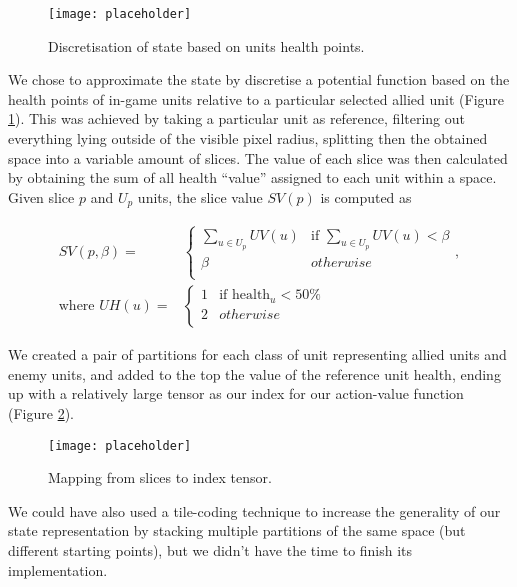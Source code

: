 \begin{figure}[h]
    \centering
    \texttt{[image: placeholder]}
    \caption{Discretisation of state based on units health points.}
    \label{fig:discrete_state}
\end{figure}

We chose to approximate the state by discretise a potential function
\citep{diebelthrun} based on the health points of in-game units relative to a
particular selected allied unit (Figure \ref{fig:discrete_state}). This was
achieved by taking a particular unit as reference, filtering out everything
lying outside of the visible pixel radius, splitting then the obtained space
into a variable amount of slices. The value of each slice was then calculated by
obtaining the sum of all health ``value'' assigned to each unit within a space.
Given slice $p$ and $U_p$ units, the slice value $SV(p)$ is computed as

\begin{equation}
  \begin{aligned}
    SV(p, \beta) = & 
    \begin{cases}
      \sum_{u \in U_p}{UV(u)} & \text{if } \sum_{u \in U_p}{UV(u)} < \beta \\
      \beta & otherwise\\
    \end{cases}, \\ \text{where } 
    UH(u) = &
    \begin{cases}
      1 & \text{if } \text{health}_u < 50\%\\
      2 & otherwise \\
    \end{cases} 
  \end{aligned}
\end{equation}

We created a pair of partitions for each class of unit representing allied units
and enemy units, and added to the top the value of the reference unit health,
ending up with a relatively large tensor as our index for our action-value
function (Figure \ref{fig:array_state}).

\begin{figure}[h]
    \centering
    \texttt{[image: placeholder]}
    \caption{Mapping from slices to index tensor.}
    \label{fig:array_state}
\end{figure}

We could have also used a tile-coding
technique\citep{stone_sutton_keepaway} to increase the generality of our state
representation by stacking multiple partitions of the same space (but different
starting points), but we didn't have the time to finish its implementation.

